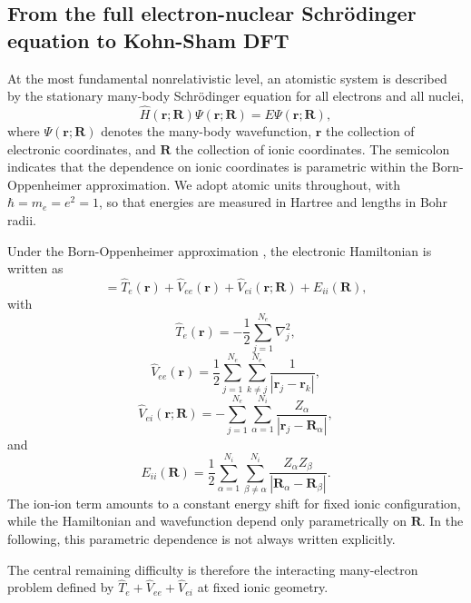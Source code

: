 \subsection{From the full electron-nuclear Schr\"odinger equation to Kohn-Sham DFT}
\label{subsec:dft_background}

At the most fundamental nonrelativistic level, an atomistic system is described by
the stationary many-body Schr\"odinger equation for all electrons and all nuclei,
\begin{equation}
\hat{H}(\bm{r};\bm{R}) \Psi(\bm{r};\bm{R})
=
E \Psi(\bm{r};\bm{R}),
\end{equation}
where $\Psi(\bm{r};\bm{R})$ denotes the many-body wavefunction, $\bm{r}$ the
collection of electronic coordinates, and $\bm{R}$ the collection of ionic
coordinates. The semicolon indicates that the dependence on ionic coordinates
is parametric within the Born-Oppenheimer approximation. We adopt atomic units throughout,
with $\hbar = m_e = e^2 = 1$, so that energies are measured in Hartree and
lengths in Bohr radii.

Under the Born-Oppenheimer approximation \cite{born_zur_1927}, the electronic
Hamiltonian is written as
\begin{equation}
=
\hat{T}_e(\bm{r}) + \hat{V}_{ee}(\bm{r}) + \hat{V}_{ei}(\bm{r};\bm{R}) + E_{ii}(\bm{R}),
\end{equation}
with
\begin{equation}
\hat{T}_e(\bm{r}) = -\frac{1}{2}\sum_{j=1}^{N_e} \nabla_j^2,
\end{equation}
\begin{equation}
\hat{V}_{ee}(\bm{r}) =
\frac{1}{2}\sum_{j=1}^{N_e}\sum_{k \ne j}^{N_e}\frac{1}{|\bm{r}_j-\bm{r}_k|},
\end{equation}
\begin{equation}
\hat{V}_{ei}(\bm{r};\bm{R}) =
-\sum_{j=1}^{N_e}\sum_{\alpha=1}^{N_i}\frac{Z_{\alpha}}{|\bm{r}_j-\bm{R}_{\alpha}|},
\end{equation}
and
\begin{equation}
E_{ii}(\bm{R}) =
\frac{1}{2}\sum_{\alpha=1}^{N_i}\sum_{\beta \ne \alpha}^{N_i}
\frac{Z_{\alpha} Z_{\beta}}{|\bm{R}_{\alpha}-\bm{R}_{\beta}|}.
\end{equation}
The ion-ion term amounts to a constant energy shift for fixed ionic
configuration, while the Hamiltonian and wavefunction depend only
parametrically on $\bm{R}$. In the following, this parametric dependence is
not always written explicitly.

The central remaining difficulty is therefore the interacting many-electron
problem defined by $\hat{T}_e + \hat{V}_{ee} + \hat{V}_{ei}$ at fixed ionic
geometry.

